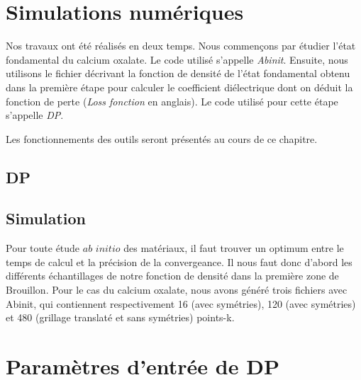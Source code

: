 \documentclass[12pt, french]{report}
\theoremstyle{theoreme}
\begin{document}
\chapter{Simulations numériques}
Nos travaux ont été réalisés en deux temps. Nous commençons par étudier l'état fondamental du calcium oxalate. Le code utilisé s'appelle \textit{Abinit}. Ensuite, nous utilisons le fichier décrivant la fonction de densité de l'état fondamental obtenu dans la première étape pour calculer le coefficient diélectrique dont on déduit la fonction de perte (\textit{Loss fonction} en anglais). Le code utilisé pour cette étape s'appelle \textit{DP}.

Les fonctionnements des outils seront présentés au cours de ce chapitre.



\section{DP}

\section{Simulation}

Pour toute étude $\textit{ab initio }$des matériaux, il faut trouver un optimum entre le temps de calcul et la précision de la convergeance. Il nous faut donc d'abord les différents échantillages de notre fonction de densité dans la première zone de Brouillon. Pour le cas du calcium oxalate, nous avons généré trois fichiers avec Abinit, qui contiennent respectivement 16 (avec symétries), 120 (avec symétries) et 480 (grillage translaté et sans symétries) points-k.





\appendix
\chapter{Paramètres d'entrée de DP}
\end{document}
